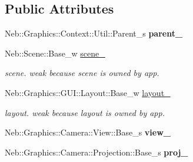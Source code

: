 \subsection*{\-Public \-Attributes}
\begin{DoxyCompactItemize}
\item 
\hypertarget{classNeb_1_1Graphics_1_1Context_1_1Base_a6b776daa9d8eb3485aa2135ae49a33ef}{\-Neb\-::\-Graphics\-::\-Context\-::\-Util\-::\-Parent\-\_\-s {\bfseries parent\-\_\-}}\label{classNeb_1_1Graphics_1_1Context_1_1Base_a6b776daa9d8eb3485aa2135ae49a33ef}

\item 
\hypertarget{classNeb_1_1Graphics_1_1Context_1_1Base_a4f3f4b08c7a51f9c03340a0ddaeb7ae6}{\-Neb\-::\-Scene\-::\-Base\-\_\-w \hyperlink{classNeb_1_1Graphics_1_1Context_1_1Base_a4f3f4b08c7a51f9c03340a0ddaeb7ae6}{scene\-\_\-}}\label{classNeb_1_1Graphics_1_1Context_1_1Base_a4f3f4b08c7a51f9c03340a0ddaeb7ae6}

\begin{DoxyCompactList}\small\item\em scene. weak because scene is owned by app. \end{DoxyCompactList}\item 
\hypertarget{classNeb_1_1Graphics_1_1Context_1_1Base_a0f815690b1cb0a9c84706617298512be}{\-Neb\-::\-Graphics\-::\-G\-U\-I\-::\-Layout\-::\-Base\-\_\-w \hyperlink{classNeb_1_1Graphics_1_1Context_1_1Base_a0f815690b1cb0a9c84706617298512be}{layout\-\_\-}}\label{classNeb_1_1Graphics_1_1Context_1_1Base_a0f815690b1cb0a9c84706617298512be}

\begin{DoxyCompactList}\small\item\em layout. weak because layout is owned by app. \end{DoxyCompactList}\item 
\hypertarget{classNeb_1_1Graphics_1_1Context_1_1Base_a7f75186f4123135d605a5b6a84aa1fb4}{\-Neb\-::\-Graphics\-::\-Camera\-::\-View\-::\-Base\-\_\-s {\bfseries view\-\_\-}}\label{classNeb_1_1Graphics_1_1Context_1_1Base_a7f75186f4123135d605a5b6a84aa1fb4}

\item 
\hypertarget{classNeb_1_1Graphics_1_1Context_1_1Base_aa9971d53fc9c8c066ec63f7ce13edbbd}{\-Neb\-::\-Graphics\-::\-Camera\-::\-Projection\-::\-Base\-\_\-s {\bfseries proj\-\_\-}}\label{classNeb_1_1Graphics_1_1Context_1_1Base_aa9971d53fc9c8c066ec63f7ce13edbbd}

\end{DoxyCompactItemize}



